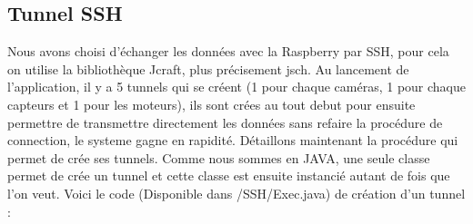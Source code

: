 \documentclass[a4paper,11pt]{report}
\begin{document}
		\subsection{Tunnel SSH}
			Nous avons choisi d'échanger les données avec la Raspberry par SSH, pour cela on utilise la bibliothèque Jcraft, plus précisement jsch. Au lancement de l'application, il y a 5 tunnels qui se créent (1 pour chaque caméras, 1 pour chaque capteurs et 1 pour les moteurs), ils sont crées au tout debut pour ensuite permettre de transmettre directement les données sans refaire la procédure de connection, le systeme gagne en rapidité. 
			\newline Détaillons maintenant la procédure qui permet de crée ses tunnels. Comme nous sommes en JAVA, une seule classe permet de crée un tunnel et cette classe est ensuite instancié autant de fois que l'on veut.
			\newline Voici le code (Disponible dans /SSH/Exec.java) de création d'un tunnel :
			
\end{document}
